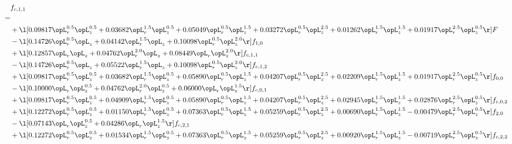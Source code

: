 \begin{alignat}{2} 
\label{eq:f_11_1} 
& f_{c,1,1} \nonumber \\ 
 = \\ 
& + \l[  0.09817 \opL_r^{0.5} \opL_z^{0.5} +  0.03682 \opL_r^{1.5} \opL_z^{0.5} +  0.05049 \opL_r^{0.5} \opL_z^{1.5} +  0.03272 \opL_r^{0.5} \opL_z^{2.5} +  0.01262 \opL_r^{1.5} \opL_z^{1.5} +  0.01917 \opL_r^{2.5} \opL_z^{0.5}  \r] F \nonumber \\ 
& - \l[  0.14726 \opL_r^{0.5} \opL_z +  0.04142 \opL_r^{1.5} \opL_z +  0.10098 \opL_r^{0.5} \opL_z^{2.0}  \r] f_{1,0} \nonumber \\ 
& + \l[  0.12857 \opL_r \opL_z +  0.04762 \opL_r^{2.0} \opL_z +  0.08449 \opL_r \opL_z^{2.0}  \r] f_{c,1,1} \nonumber \\ 
& - \l[  0.14726 \opL_r^{0.5} \opL_z +  0.05522 \opL_r^{1.5} \opL_z +  0.10098 \opL_r^{0.5} \opL_z^{2.0}  \r] f_{c,1,2} \nonumber \\ 
& + \l[  0.09817 \opL_r^{0.5} \opL_z^{0.5} +  0.03682 \opL_r^{1.5} \opL_z^{0.5} +  0.05890 \opL_r^{0.5} \opL_z^{1.5} +  0.04207 \opL_r^{0.5} \opL_z^{2.5} +  0.02209 \opL_r^{1.5} \opL_z^{1.5} +  0.01917 \opL_r^{2.5} \opL_z^{0.5}  \r] f_{0,0} \nonumber \\ 
& - \l[  0.10000 \opL_r \opL_z^{0.5} +  0.04762 \opL_r^{2.0} \opL_z^{0.5} +  0.06000 \opL_r \opL_z^{1.5}  \r] f_{c,0,1} \nonumber \\ 
& + \l[  0.09817 \opL_r^{0.5} \opL_z^{0.5} +  0.04909 \opL_r^{1.5} \opL_z^{0.5} +  0.05890 \opL_r^{0.5} \opL_z^{1.5} +  0.04207 \opL_r^{0.5} \opL_z^{2.5} +  0.02945 \opL_r^{1.5} \opL_z^{1.5} +  0.02876 \opL_r^{2.5} \opL_z^{0.5}  \r] f_{c,0,2} \nonumber \\ 
& + \l[  0.12272 \opL_r^{0.5} \opL_z^{0.5} +  0.01150 \opL_r^{1.5} \opL_z^{0.5} +  0.07363 \opL_r^{0.5} \opL_z^{1.5} +  0.05259 \opL_r^{0.5} \opL_z^{2.5} +  0.00690 \opL_r^{1.5} \opL_z^{1.5}   -0.00479 \opL_r^{2.5} \opL_z^{0.5}  \r] f_{2,0} \nonumber \\ 
& - \l[  0.07143 \opL_r \opL_z^{0.5} +  0.04286 \opL_r \opL_z^{1.5}  \r] f_{c,2,1} \nonumber \\ 
& + \l[  0.12272 \opL_r^{0.5} \opL_z^{0.5} +  0.01534 \opL_r^{1.5} \opL_z^{0.5} +  0.07363 \opL_r^{0.5} \opL_z^{1.5} +  0.05259 \opL_r^{0.5} \opL_z^{2.5} +  0.00920 \opL_r^{1.5} \opL_z^{1.5}   -0.00719 \opL_r^{2.5} \opL_z^{0.5}  \r] f_{c,2,2} \nonumber \\ 
\end{alignat} 


